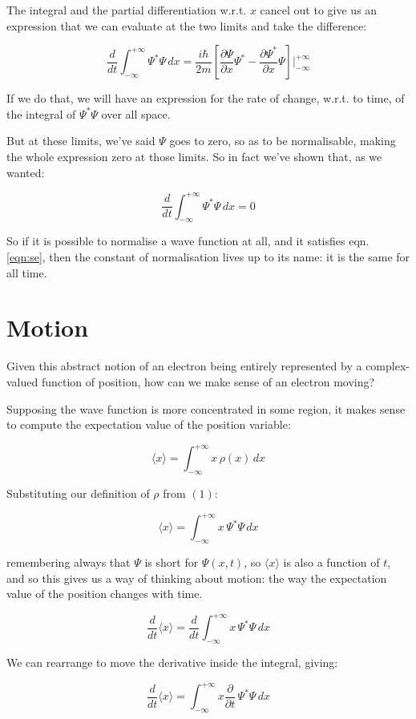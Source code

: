 The integral and the partial differentiation w.r.t. $x$ cancel out to give us an expression that we can evaluate at the two limits and take the difference:

$$
\frac{d}{d t}
\int_{-\infty}^{+\infty}
\Psi^*\Psi
\,dx
=
\frac{i \hbar}{2m}
\left[
\frac{\partial \Psi}{\partial x}\Psi^*
- \frac{\partial \Psi^*}{\partial x}\Psi
\right]
\bigg\rvert_{-\infty}^{+\infty}
$$

If we do that, we will have an expression for the rate of change, w.r.t. to time, of the integral of $\Psi^*\Psi$ over all space.

But at these limits, we've said $\Psi$ goes to zero, so as to be normalisable, making the whole expression zero at those limits. So in fact we've shown that, as we wanted:

$$
\frac{d}{d t}
\int_{-\infty}^{+\infty}
\Psi^*\Psi
\,dx
= 0
$$

So if it is possible to normalise a wave function at all, and it satisfies eqn. \ref{eqn:se}, then the constant of normalisation lives up to its name: it is the same for all time.

\section{Motion}

Given this abstract notion of an electron being entirely represented by a complex-valued function of position, how can we make sense of an electron moving?

Supposing the wave function is more concentrated in some region, it makes sense to compute the expectation value of the position variable:

$$
\langle x \rangle =
\int_{-\infty}^{+\infty}
x \, \rho(x)
\,dx
$$

Substituting our definition of $\rho$ from $(1)$:

$$
\langle x \rangle =
\int_{-\infty}^{+\infty}
x \, \Psi^*\Psi
\,dx
$$

remembering always that $\Psi$ is short for $\Psi(x, t)$, so $\langle x \rangle$ is also a function of $t$, and so this gives us a way of thinking about motion: the way the expectation value of the position changes with time.

$$
\frac{d}{dt} \langle x \rangle =
\frac{d}{dt}
\int_{-\infty}^{+\infty}
x \, \Psi^*\Psi
\,dx
$$

We can rearrange to move the derivative inside the integral, giving:

$$
\frac{d}{dt} \langle x \rangle =
\int_{-\infty}^{+\infty}
x \frac{\partial}{\partial t}
\, \Psi^*\Psi
\,dx
$$

